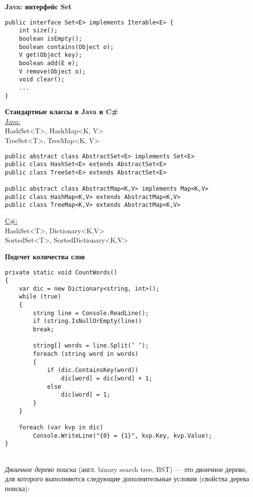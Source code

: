 {\bf Java: интерфейс Set}\\
\begin{verbatim}
public interface Set<E> implements Iterable<E> {
    int size();
    boolean isEmpty();
    boolean contains(Object o);
    V get(Object key);
    boolean add(E e);
    V remove(Object o);
    void clear();
    ...
}
\end{verbatim}

{\bf Стандартные классы в Java и C\#}\\


\underline{Java:} \\
HashSet<T>, HashMap<K, V> \\
TreeSet<T>, TreeMap<K, V>


\begin{verbatim}
public abstract class AbstractSet<E> implements Set<E>
public class HashSet<E> extends AbstractSet<E>
public class TreeSet<E> extends AbstractSet<E>

public abstract class AbstractMap<K,V> implements Map<K,V>
public class HashMap<K,V> extends AbstractMap<K,V>
public class TreeMap<K,V> extends AbstractMap<K,V>
\end{verbatim}

\underline{C\#:} \\
HashSet<T>, Dictionary<K,V> \\
SortedSet<T>, SortedDictionary<K,V>


{\bf Подсчет количества слов}\\
\begin{verbatim}
private static void CountWords()
{
    var dic = new Dictionary<string, int>();
    while (true)
    {
        string line = Console.ReadLine();
        if (string.IsNullOrEmpty(line))
        break;
        
        string[] words = line.Split(’ ’);
        foreach (string word in words)
        {
            if (dic.ContainsKey(word))
                dic[word] = dic[word] + 1;
            else
                dic[word] = 1;
        }
    }
    
    foreach (var kvp in dic)
        Console.WriteLine("{0} = {1}", kvp.Key, kvp.Value);
}
\end{verbatim}

\\

\textit{Двоичное дерево поиска} (англ. binary search tree, BST) — это двоичное дерево, для которого выполняются следующие дополнительные условия (свойства дерева поиска):

